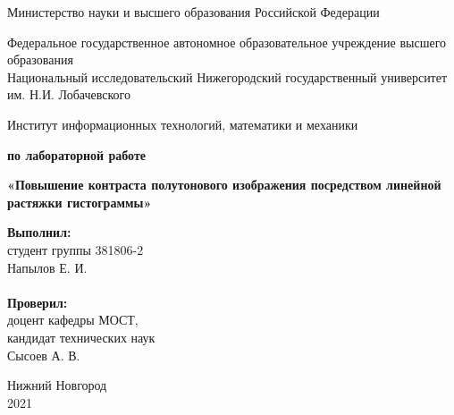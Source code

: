 \documentclass{report}
\begin{document}
	\begin{titlepage}

		\begin{center}
			Министерство науки и высшего образования Российской Федерации
		\end{center}

		\begin{center}
			Федеральное государственное автономное образовательное учреждение высшего образования \\
			Национальный исследовательский Нижегородский государственный университет им. Н.И. Лобачевского
		\end{center}

		\begin{center}
			Институт информационных технологий, математики и механики
		\end{center}

		\vspace{4em}

		\begin{center}
			\textbf{ по лабораторной работе} \\
		\end{center}
		\begin{center}
			\textbf{\Large«Повышение контраста полутонового изображения посредством линейной растяжки гистограммы»} \\
		\end{center}

		\vspace{4em}

		\newbox{\lbox}
		\newlength{\maxl}
		\setlength{\maxl}{\wd\lbox}
		\hfill\parbox{7cm}{
			\hspace*{5cm}\hspace*{-5cm}\textbf{Выполнил:} \\ студент группы 381806-2 \\ Напылов Е. И.\\
			\\
			\hspace*{5cm}\hspace*{-5cm}\textbf{Проверил:}\\ доцент кафедры МОСТ, \\ кандидат технических наук \\ Сысоев А. В.\\
		}
		\vspace{\fill}

		\begin{center} Нижний Новгород \\ 2021 \end{center}

	\end{titlepage}
\end{document}
